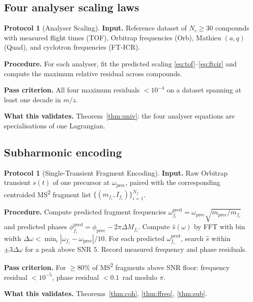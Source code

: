 \documentclass[twocolumn,10pt,a4paper]{article}
\theoremstyle{thmstyle}
\theoremstyle{definition}
\newtheorem{protocol}[theorem]{Protocol}
\theoremstyle{remark}
\begin{document}
\subsection{Four analyser scaling laws}

\begin{protocol}[Analyser Scaling]
\label{prot:scale}
\textbf{Input.} Reference dataset of $N_{c}\geq 30$ compounds with
measured flight times (TOF), Orbitrap frequencies (Orb), Mathieu
$(a,q)$ (Quad), and cyclotron frequencies (FT-ICR).

\textbf{Procedure.} For each analyser, fit the predicted scaling
\eqref{eq:tof}--\eqref{eq:ftcir} and compute the maximum relative
residual across compounds.

\textbf{Pass criterion.} All four maximum residuals
$<10^{-4}$ on a dataset spanning at least one decade in $m/z$.

\textbf{What this validates.} Theorem~\ref{thm:univ}: the four
analyser equations are specialisations of one Lagrangian.
\end{protocol}

\subsection{Subharmonic encoding}

\begin{protocol}[Single-Transient Fragment Encoding]
\label{prot:sub}
\textbf{Input.} Raw Orbitrap transient $s(t)$ of one precursor at
$\omega_{\mathrm{prec}}$, paired with the corresponding centroided
MS\textsuperscript{2} fragment list
$\{(m_{f_{i}},I_{f_{i}})\}_{i=1}^{N_{f}}$.

\textbf{Procedure.} Compute predicted fragment frequencies
$\omega_{f_{i}}^{\mathrm{pred}}=\omega_{\mathrm{prec}}\sqrt{m_{\mathrm{prec}}/m_{f_{i}}}$
and predicted phases
$\phi_{f_{i}}^{\mathrm{pred}}=\phi_{\mathrm{prec}}-2\pi\Delta M_{f_{i}}$.
Compute $\hat s(\omega)$ by FFT with bin width
$\Delta\omega<\min_{i}|\omega_{f_{i}}-\omega_{\mathrm{prec}}|/10$.
For each predicted $\omega_{f_{i}}^{\mathrm{pred}}$, search $\hat s$
within $\pm 3\Delta\omega$ for a peak above SNR $5$. Record measured
frequency and phase residuals.

\textbf{Pass criterion.} For $\geq 80\%$ of MS\textsuperscript{2}
fragments above SNR floor: frequency residual $<10^{-5}$, phase
residual $<0.1$~rad modulo $\pi$.

\textbf{What this validates.} Theorems~\ref{thm:coh}, \ref{thm:ffreq},
\ref{thm:sub}.
\end{protocol}
\end{document}
